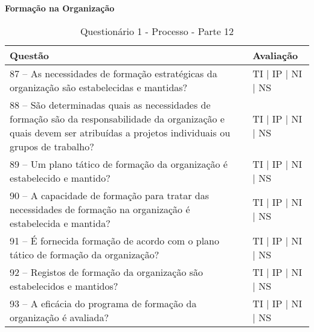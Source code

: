 \documentclass[openany,10pt,a4paper]{article}
\begin{document}
\begin{appendix}
\begin{table}[h]
\textbf{Formação na Organização}
	\centering
	\caption{Questionário 1 - Processo - Parte 12}
	\begin{tabular}{p{3.5in}p{2in}}		
		\toprule
		\textbf{Questão}  & \textbf{Avaliação}\\ 
		\midrule
		87 – As necessidades de formação estratégicas da organização são estabelecidas e mantidas?
 & TI | IP | NI | NS \\
        \midrule
		88 – São determinadas quais as necessidades de formação são da responsabilidade da 
organização e quais devem ser atribuídas a projetos individuais ou grupos de trabalho?
 & TI | IP | NI | NS \\
		\midrule
		89 – Um plano tático de formação da organização é estabelecido e mantido?
 & TI | IP | NI | NS \\
		\midrule
        90 – A capacidade de formação para tratar das necessidades de formação na organização é 
estabelecida e mantida?
 & TI | IP | NI | NS \\
		\midrule
		91 – É fornecida formação de acordo com o plano tático de formação da organização?
  & TI | IP | NI | NS \\
		\midrule
		92 – Registos de formação da organização são estabelecidos e mantidos?
 & TI | IP | NI | NS \\
 \midrule
		93 – A eficácia do programa de formação da organização é avaliada?
 & TI | IP | NI | NS \\
		\bottomrule
	\end{tabular} 
	\label{tab:tabela1}
\end{table}


\end{appendix}
\end{document}
